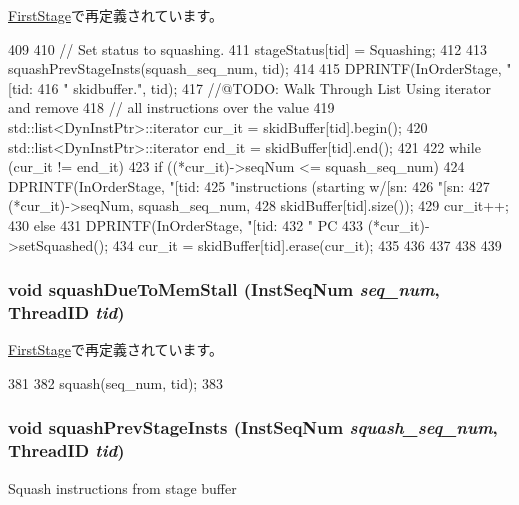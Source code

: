 \hyperlink{classFirstStage_ad9e3c0e17499440cfafb6145d7be97a1}{FirstStage}で再定義されています。


\begin{DoxyCode}
409 {
410     // Set status to squashing.
411     stageStatus[tid] = Squashing;
412 
413     squashPrevStageInsts(squash_seq_num, tid);
414 
415     DPRINTF(InOrderStage, "[tid:%
416             " skidbuffer.\n", tid);
417     //@TODO: Walk Through List Using iterator and remove
418     //       all instructions over the value
419     std::list<DynInstPtr>::iterator cur_it = skidBuffer[tid].begin();
420     std::list<DynInstPtr>::iterator end_it = skidBuffer[tid].end();
421 
422     while (cur_it != end_it) {
423         if ((*cur_it)->seqNum <= squash_seq_num) {
424             DPRINTF(InOrderStage, "[tid:%
425                     "instructions (starting w/[sn:%
426                     "[sn:%
427                     (*cur_it)->seqNum, squash_seq_num,
428                     skidBuffer[tid].size());
429             cur_it++;
430         } else {
431             DPRINTF(InOrderStage, "[tid:%
432                     " PC %
433             (*cur_it)->setSquashed();
434             cur_it = skidBuffer[tid].erase(cur_it);
435         }
436 
437     }
438 
439 }
\end{DoxyCode}
\hypertarget{classPipelineStage_a960b60a46045a5363df0c263f0f43902}{
\subsubsection[{squashDueToMemStall}]{\setlength{\rightskip}{0pt plus 5cm}void squashDueToMemStall ({\bf InstSeqNum} {\em seq\_\-num}, \/  {\bf ThreadID} {\em tid})}}
\label{classPipelineStage_a960b60a46045a5363df0c263f0f43902}


\hyperlink{classFirstStage_a960b60a46045a5363df0c263f0f43902}{FirstStage}で再定義されています。


\begin{DoxyCode}
381 {
382     squash(seq_num, tid);    
383 }
\end{DoxyCode}
\hypertarget{classPipelineStage_adbce9d3c16239dca0ffd19bc176ea258}{
\subsubsection[{squashPrevStageInsts}]{\setlength{\rightskip}{0pt plus 5cm}void squashPrevStageInsts ({\bf InstSeqNum} {\em squash\_\-seq\_\-num}, \/  {\bf ThreadID} {\em tid})}}
\label{classPipelineStage_adbce9d3c16239dca0ffd19bc176ea258}
Squash instructions from stage buffer 


